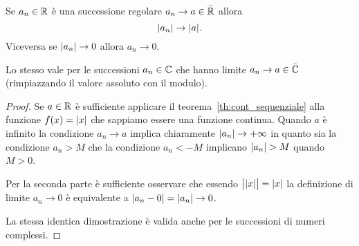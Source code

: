 \begin{theorem}
\mymark{**}
\label{th:limite_abs}
Se $a_n\in \mathbb R$ è una successione regolare $a_n \to a \in \bar {\mathbb R}$
allora
\[
  {\left|a_n\right|} \to {\left|a\right|}.
\]
Viceversa se ${\left|a_n\right|} \to 0$ allora $a_n \to 0$.

Lo stesso vale per le successioni $a_n\in \mathbb C$ che hanno limite
$a_n\to a\in \bar {\mathbb C}$ (rimpiazzando il valore assoluto
con il modulo).
\end{theorem}
%
\begin{proof}
Se $a\in \mathbb R$ è sufficiente applicare il teorema~\ref{th:cont_sequenziale}
alla funzione $f(x)={\left|x\right|}$ che sappiamo essere una funzione continua.
Quando $a$ è infinito la condizione $a_n\to a$ implica chiaramente
${\left|a_n\right|}\to +\infty$ in quanto sia la condizione $a_n>M$
che la condizione
$a_n < -M$ implicano ${\left|a_n\right|}>M$ quando $M>0$.

Per la seconda parte è sufficiente osservare che essendo
$\big\lvert{\left|x\right|}\big\rvert
 = {\left|x\right|}$ la definizione di limite $a_n\to 0$ è equivalente a
 ${\left|a_n-0\right|}={\left|a_n\right|}\to 0$.

 La stessa identica dimostrazione è valida anche per le successioni di numeri complessi.
\end{proof}

